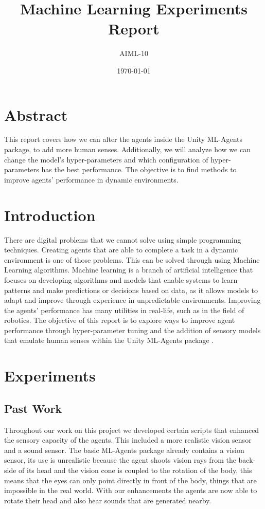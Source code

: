 \documentclass[a4paper,12pt]{article}
\title{Machine Learning Experiments Report}
\author{AIML-10}
\date{\today}
\begin{document}
\maketitle
\tableofcontents
\newpage

\section*{Abstract}
This report covers how we can alter the agents inside the Unity ML-Agents package, to add more human senses. Additionally, we will analyze how we can change the model's hyper-parameters and which configuration of hyper-parameters has the best performance. The objective is to find methods to improve agents' performance in dynamic environments.


\section{Introduction}
There are digital problems that we cannot solve using simple programming techniques. Creating agents that are able to complete a task in a dynamic environment is one of those problems. This can be solved through using Machine Learning algorithms. Machine learning is a branch of artificial intelligence that focuses on developing algorithms and models that enable systems to learn patterns and make predictions or decisions based on data, as it allows models to adapt and improve through experience in unpredictable environments. Improving the agents' performance has many utilities in real-life, such as in the field of robotics. The objective of this report is to explore ways to improve agent performance through hyper-parameter tuning and the addition of sensory models \cite{benoit2002fuzzy} that emulate human senses within the Unity ML-Agents package \cite{unityTechnologies2019mlagents} \cite{ilosvay2024unity} \cite{juliani2018unity}.

\section{Experiments}

\subsection{Past Work}
Throughout our work on this project we developed certain scripts that enhanced the sensory capacity of the agents. This included a more realistic vision sensor and a sound sensor. The basic ML-Agents package already contains a vision sensor, its use is unrealistic because the agent shoots vision rays from the back-side of its head and the vision cone is coupled to the rotation of the body, this means that the eyes can only point directly in front of the body, things that are impossible in the real world. With our enhancements the agents are now able to rotate their head and also hear sounds that are generated nearby. 
\end{document}
